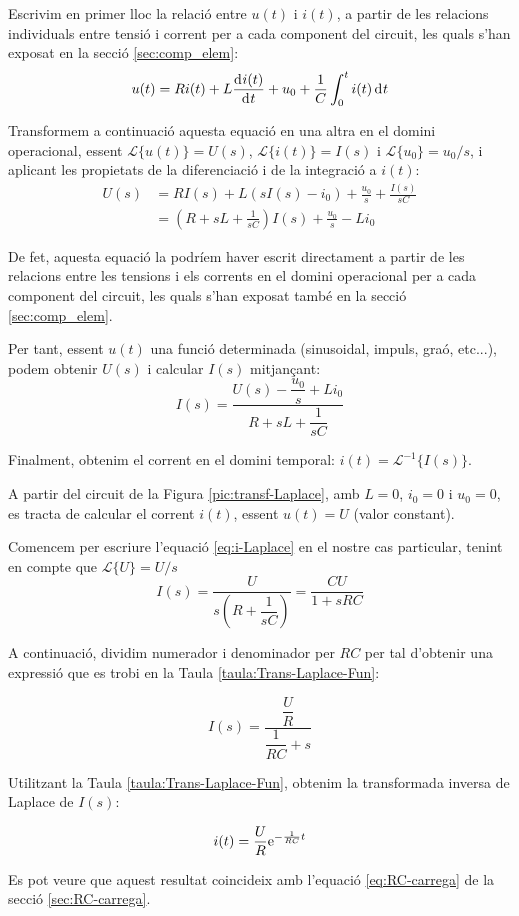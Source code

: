Escrivim en primer lloc  la relació entre $u(t)$ i $i(t)$, a partir
de les relacions individuals entre tensió i corrent per a cada
component del circuit, les quals s'han exposat en la secció
\vref{sec:comp_elem}:
\begin{equation}
    u(t) = R i(t) + L \frac{\diff i(t)}{\diff t} + u_0 + \frac{1}{C}
    \int_0^t i(t) \diff t
\end{equation}

Transformem a continuació aquesta equació en una altra en el domini
operacional, essent $\mathscr{L}\{u(t)\} = U(s)$,
$\mathscr{L}\{i(t)\} = I(s)$ i $\mathscr{L}\{u_0\} =
u_0/s$, i aplicant les propietats de la diferenciació i de la
integració a $i(t)$:
\begin{equation}\begin{split}
    U(s) &= R I(s) + L(s I(s) -i_0) + \frac{u_0}{s} + \frac{I(s)}{s
    C} \\[1ex]
    &= \left( R + s L +\frac{1}{s C}\right)I(s) + \frac{u_0}{s} - L i_0
\end{split}\end{equation}

De fet, aquesta equació la podríem haver escrit directament a
partir de les relacions entre les tensions i els corrents en el
domini operacional per a cada  component del circuit, les quals
s'han exposat també en la secció \vref{sec:comp_elem}.

Per tant, essent $u(t)$  una funció determinada (sinusoidal, impuls,
graó, etc...), podem obtenir $U(s)$ i calcular $I(s)$ mitjançant:
\begin{equation}
    I(s) = \frac{U(s)-\dfrac{u_0}{s} + L i_0}{R + s L
    +\dfrac{1}{s C}}\label{eq:i-Laplace}
\end{equation}

Finalment, obtenim el corrent en el domini temporal: $i(t) =
\mathscr{L}^{-1}\{I(s)\}$.


\begin{exemple}
    A partir del circuit de la Figura \vref{pic:transf-Laplace}, amb
    $L=0$, $i_0=0$ i $u_0=0$, es tracta de calcular el corrent $i(t)$,
    essent $u(t)=U$ (valor constant).

    Comencem per escriure l'equació \eqref{eq:i-Laplace} en el nostre
    cas particular, tenint en compte que $\mathscr{L}\{U\} = U/s$
    \[
        I(s) = \frac{U}{s\left(R + \dfrac{1}{s C}\right)} = \frac{C U}{1 + s R C}
    \]

    A continuació, dividim numerador i denominador per $R C$ per tal
    d'obtenir una expressió que es trobi en la Taula
    \vref{taula:Trans-Laplace-Fun}:

    \[
        I(s) = \frac{\dfrac{U}{R}}{\dfrac{1}{R C} + s}
    \]

    Utilitzant la Taula \vref{taula:Trans-Laplace-Fun}, obtenim la transformada inversa de Laplace de $I(s)$:

    \[
        i(t) = \frac{U}{R} \mathrm{e}^{-\frac{1}{R C}t}
    \]

    Es pot veure que aquest resultat coincideix amb l'equació \eqref{eq:RC-carrega} de la secció \vref{sec:RC-carrega}.
\end{exemple}

